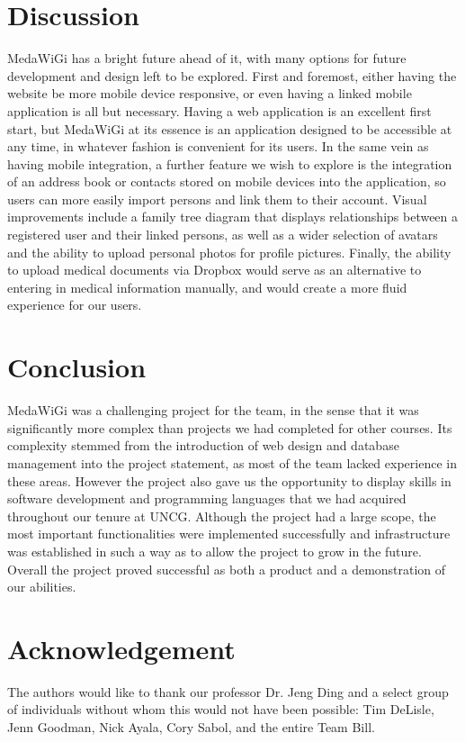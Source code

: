 \documentclass[twocolumn,12pt]{article}
\begin{document}
\section{Discussion}
MedaWiGi has a bright future ahead of it, with many options for future development and design left to be explored. First and foremost, either having the website be more mobile device responsive, or even having a linked mobile application is all but necessary. Having a web application is an excellent first start, but MedaWiGi at its essence is an application designed to be accessible at any time, in whatever fashion is convenient for its users. In the same vein as having mobile integration, a further feature we wish to explore is the integration of an address book or contacts stored on mobile devices into the application, so users can more easily import persons and link them to their account. Visual improvements include a family tree diagram that displays relationships between a registered user and their linked persons, as well as a wider selection of avatars and the ability to upload personal photos for profile pictures. Finally, the ability to upload medical documents via Dropbox would serve as an alternative to entering in medical information manually, and would create a more fluid experience for our users.

\section{Conclusion}
MedaWiGi was a challenging project for the team, in the sense that it was significantly more complex than projects we had completed for other courses. Its complexity stemmed from the introduction of web design and database management into the project statement, as most of the team lacked experience in these areas. However the project also gave us the opportunity to display skills in software development and programming languages that we had acquired throughout our tenure at UNCG. Although the project had a large scope, the most important functionalities were implemented successfully and infrastructure was established in such a way as to allow the project to grow in the future. Overall the project proved successful as both a product and a demonstration of our abilities.

\section*{Acknowledgement}
The authors would like to thank our professor Dr. Jeng Ding and a select group of individuals without whom this would not have been possible: Tim DeLisle, Jenn Goodman, Nick Ayala, Cory Sabol, and the entire Team Bill.
\end{document}

